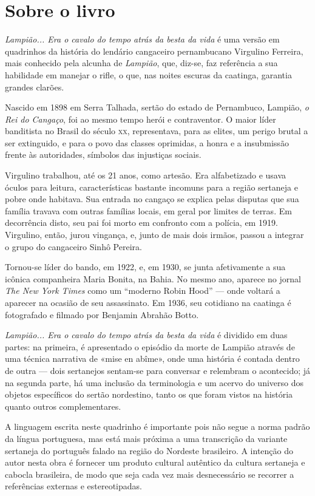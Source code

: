 \documentclass[11pt]{extarticle}
\begin{document}
\section{Sobre o livro}

\textit{Lampião... Era o cavalo do tempo atrás da besta da vida} é uma versão em quadrinhos da 
história do lendário cangaceiro pernambucano Virgulino Ferreira, mais conhecido pela alcunha de \textit{Lampião},
que, diz-se, faz referência a sua habilidade em manejar o rifle,
o que, nas noites escuras da caatinga, garantia grandes clarões.

Nascido em 1898 em Serra Talhada, sertão do estado de Pernambuco, Lampião, \textit{o Rei do Cangaço}, 
foi ao mesmo tempo herói e contraventor. O maior líder banditista no Brasil do século \textsc{xx},
representava, para as elites, um perigo brutal a ser extinguido, e para o povo das
classes oprimidas, a honra e a insubmissão frente às autoridades, símbolos das injustiças sociais. 

Virgulino trabalhou, até os 21 anos, como artesão. Era alfabetizado e usava óculos para leitura, 
características bastante incomuns para a região sertaneja e pobre onde habitava.
Sua entrada no cangaço se explica pelas disputas que sua família travava com outras famílias locais, 
em geral por limites de terras. Em decorrência disto, seu pai foi morto em confronto com a polícia, em 1919. 
Virgulino, então, jurou vingança, e, junto de mais dois irmãos, passou a integrar o grupo do cangaceiro Sinhô Pereira.

Tornou-se líder do bando, em 1922, e, em 1930, se junta afetivamente a sua icônica companheira Maria Bonita, 
na Bahia. No mesmo ano, aparece no jornal \textit{The New York Times} como um ``moderno Robin Hood'' --- 
onde voltará a aparecer na ocasião de seu assassinato. Em 1936, seu cotidiano na caatinga é fotografado e 
filmado por Benjamin Abrahão Botto. 

\textit{Lampião... Era o cavalo do tempo atrás da besta da vida} é dividido em duas partes: na primeira, é apresentado o episódio da morte de Lampião através 
de uma técnica narrativa de «mise en abîme», onde uma história é contada dentro de outra --- dois sertanejos sentam-se para conversar e relembram o acontecido; já na segunda parte, há uma inclusão da terminologia e um acervo do universo 
dos objetos específicos do sertão nordestino, tanto os que foram vistos na história quanto outros complementares. 

A linguagem escrita neste quadrinho é importante pois não segue a norma padrão da língua portuguesa, mas
está mais próxima a uma transcrição da variante sertaneja do português falado na região do Nordeste brasileiro. 
A intenção do autor nesta obra é fornecer um produto cultural autêntico da cultura sertaneja e cabocla
brasileira, de modo que seja cada vez mais desnecessário se recorrer a referências externas e estereotipadas. 
\end{document}
